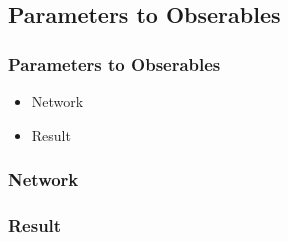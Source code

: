 \documentclass{beamer}
\begin{document}
\begin{frame}
    \subsection{Parameters to Obserables}
    \frametitle{Parameters to Obserables}
    \begin{itemize}
        \item Network
        \item Result
    \end{itemize}
\end{frame}
\begin{frame}
    \frametitle{Network}
\end{frame}
\begin{frame}
    \frametitle{Result}
\end{frame}
\end{document}
